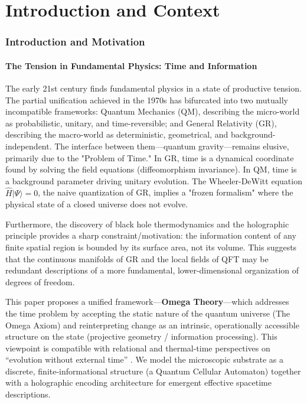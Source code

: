 \part{Introduction and Context}
\label{part:I}

\section{Introduction and Motivation}
\label{chap:intro}

\subsection{The Tension in Fundamental Physics: Time and Information}
The early 21st century finds fundamental physics in a state of productive tension. The partial unification achieved in the 1970s has bifurcated into two mutually incompatible frameworks: Quantum Mechanics (QM), describing the micro-world as probabilistic, unitary, and time-reversible; and General Relativity (GR), describing the macro-world as deterministic, geometrical, and background-independent. The interface between them---quantum gravity---remains elusive, primarily due to the "Problem of Time."
In GR, time is a dynamical coordinate found by solving the field equations (diffeomorphism invariance). In QM, time is a background parameter driving unitary evolution. The Wheeler-DeWitt equation $\hat{H}|\Psi\rangle = 0$, the naive quantization of GR, implies a "frozen formalism" where the physical state of a closed universe does not evolve.

Furthermore, the discovery of black hole thermodynamics and the holographic principle \cite{bekenstein1973black,hawking1975particle,susskind1995world} provides a sharp constraint/motivation: the information content of any finite spatial region is bounded by its surface area, not its volume. This suggests that the continuous manifolds of GR and the local fields of QFT may be redundant descriptions of a more fundamental, lower-dimensional organization of degrees of freedom.

This paper proposes a unified framework---\textbf{Omega Theory}---which addresses the time problem by accepting the static nature of the quantum universe (The Omega Axiom) and reinterpreting change as an intrinsic, operationally accessible structure on the state (projective geometry / information processing). This viewpoint is compatible with relational and thermal-time perspectives on ``evolution without external time'' \cite{PageWootters1983,ConnesRovelli1994}. We model the microscopic substrate as a discrete, finite-informational structure (a Quantum Cellular Automaton) together with a holographic encoding architecture for emergent effective spacetime descriptions.

